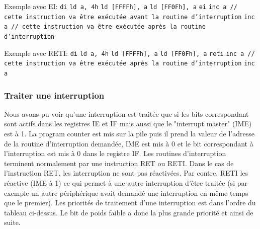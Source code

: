 \documentclass[a4paper]{article}
\begin{document}
Exemple avec EI: \newline
\texttt{di} \newline
\texttt{ld a, 4h} \newline
\texttt{ld [FFFFh], a} \newline
\texttt{ld [FF0Fh], a} \newline
\texttt{ei} \newline
\texttt{inc a // cette instruction va être exécutée avant la routine d'interruption} \newline
\texttt{inc a // cette instruction va être exécutée après la routine d'interruption} \newline

Exemple avec RETI: \newline
\texttt{di} \newline
\texttt{ld a, 4h} \newline
\texttt{ld [FFFFh], a} \newline
\texttt{ld [FF0Fh], a} \newline
\texttt{reti} \newline
\texttt{inc a // cette instruction va être exécutée après la routine d'interruption} \newline
\texttt{inc a} \newline

\subsubsection{Traiter une interruption}
Nous avons pu voir qu'une interruption est traitée que si les bits correspondant
sont actifs dans les registres IE et IF mais aussi que le "interrupt master" (IME) est
à 1. La program counter est mis sur la pile puis il prend la valeur de l'adresse 
de la routine d'interruption demandée, IME est mis à 0 et le 
bit correspondant à l'interruption est mis à 0 dans le registre IF. Les routines
d'interruption terminent normalement par une instruction RET ou RETI. Dans le cas
de l'instruction RET, les interruption ne sont pas réactivées. Par contre, RETI
les réactive (IME à 1) ce qui permet à une autre interruption d'être
traitée (si par exemple un autre périphérique avait demandé une interruption en même
temps que le premier). Les priorités de traitement d'une interruption est dans l'ordre
du tableau ci-dessus. Le bit de poids faible a donc la plus grande priorité et ainsi
de suite.

\newpage
\end{document}
